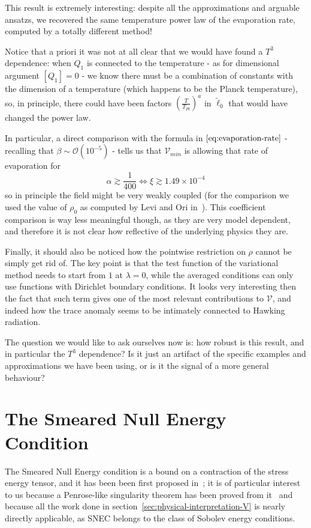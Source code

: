 This result is extremely interesting: despite all the approximations and arguable ansatzs, we recovered the same temperature power law of the evaporation rate, computed by a totally different method! 

\begin{remark}
	Notice that a priori it was not at all clear that we would have found a \(T^3\) dependence: when \(Q_1\) is connected to the temperature - as for dimensional argument \(\left[Q_1\right] = 0\) - we know there must be a combination of constants with the dimension of a temperature (which happens to be the Planck temperature), so, in principle, there could have been factors \(\left(\frac{T}{T_{Pl}}\right)^a\) in \(\tilde{\ell}_0\) that would have changed the power law.
\end{remark}

In particular, a direct comparison with the formula in \(\eqref{eq:evaporation-rate}\) - recalling that  \(\beta \sim \mathcal{O}(10^{-5})\) - tells us that \(\mathcal{V}_{min}\) is allowing that rate of evaporation for 
\[
\alpha \gtrsim \frac{1}{400} \iff \xi \gtrsim 1.49 \times 10^{-4}	
\]
so in principle the field might be very weakly coupled (for the comparison we used the value of \(\rho_0\) as computed by Levi and Ori in~\cite[]{levi2016versatile}). This coefficient comparison is way less meaningful though, as they are very model dependent, and therefore it is not clear how reflective of the underlying physics they are.

Finally, it should also be noticed how the pointwise restriction on \(\rho\) cannot be simply get rid of. The key point is that the test function of the variational method needs to start from \(1\) at \(\lambda = 0\), while the averaged conditions can only use functions with Dirichlet boundary conditions. It looks very interesting then the fact that such term gives one of the most relevant contributions to \(\mathcal{V}\), and indeed how the trace anomaly seems to be intimately connected to Hawking radiation. 

The question we would like to ask ourselves now is: how robust is this result, and in particular the \(T^3\) dependence? Is it just an artifact of the specific examples and approximations we have been using, or is it the signal of a more general behaviour? 

\section{The Smeared Null Energy Condition}
The Smeared Null Energy condition is a bound on a contraction of the stress energy tensor, and it has been been first proposed in~\cite{freivogel2018smeared}; it is of particular interest to us because a Penrose-like singularity theorem has been proved from it~\cite{freivogel2020return} and because all the work done in section~\ref{sec:physical-interpretation-V} is nearly directly applicable, as SNEC belongs to the class of Sobolev energy conditions.

